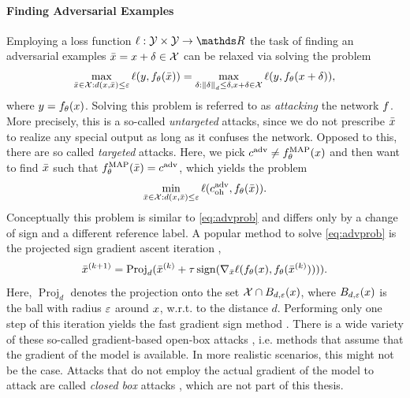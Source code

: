 \paragraph{Finding Adversarial Examples} Employing a loss function $\ell:\Oup\times\Oup\to\R$ the task of finding an adversarial examples $\bar{x}=x+\delta\in\mathcal{X}$ can be relaxed via solving the problem
%
\begin{align}\label{eq:advprob}
\max_{\bar{x}\in \mathcal{X}:d(x,\bar{x})\leq \varepsilon} \ell(y, f_\theta(\bar{x}))
=
\max_{\delta:\left\|\delta\right\|_d\leq\delta, x+\delta\in\mathcal{X}}
\ell(y, f_\theta(x+\delta)),
\end{align}
%
where $y=f_\theta(x)$. Solving this problem is referred to as \emph{attacking} the network $f$. More precisely, this is a so-called \emph{untargeted} attacks, since we do not prescribe $\bar{x}$ to realize any special output as long as it confuses the network. Opposed to this, there are so called \emph{targeted} attacks. Here, we pick $c^{\operatorname{adv}} \neq f^{\operatorname{MAP}}_\theta(x)$ and then want to find $\bar{x}$ such that $f^{\operatorname{MAP}}_\theta(\bar{x}) = c^{\operatorname{adv}}$, which yields the problem
%
\begin{align*}
\min_{\bar{x}\in \mathcal{X}:d(x,\bar{x})\leq \varepsilon} \ell(c^{\operatorname{adv}}_{{\operatorname{oh}}}, f_\theta(\bar{x})).
\end{align*}
%
%
Conceptually this problem is similar to \cref{eq:advprob} and differs only by a change of sign and a different reference label.
%
A popular method to solve \cref{eq:advprob} is the projected sign gradient ascent iteration \cite{kurakin2016adversarial},
%
\begin{align*}
\bar{x}^{(k+1)} = \operatorname{Proj}_d(\bar{x}^{(k)} + \tau \operatorname*{sign}(\nabla_{\bar{x}}
\ell(f_\theta(x), f_\theta(\bar{x}^{(k)})))).
\end{align*}
%
%
%
Here, $\operatorname{Proj}_d$ denotes the projection onto the set $\mathcal{X}\cap B_{d,\varepsilon}(x)$, where $B_{d,\varepsilon}(x)$ is the ball with radius $\varepsilon$ around $x$, w.r.t. to the distance $d$. Performing only one step of this iteration yields the fast gradient sign method \cite{goodfellow2014explaining}. There is a wide variety of these so-called gradient-based open-box attacks \cite{yuan2019adversarial}, i.e. methods that assume that the gradient of the model is available. In more realistic scenarios, this might not be the case. Attacks that do not employ the actual gradient of the model to attack are called \emph{closed box} attacks \cite{ilyas2018black}, which are not part of this thesis.
%
%
